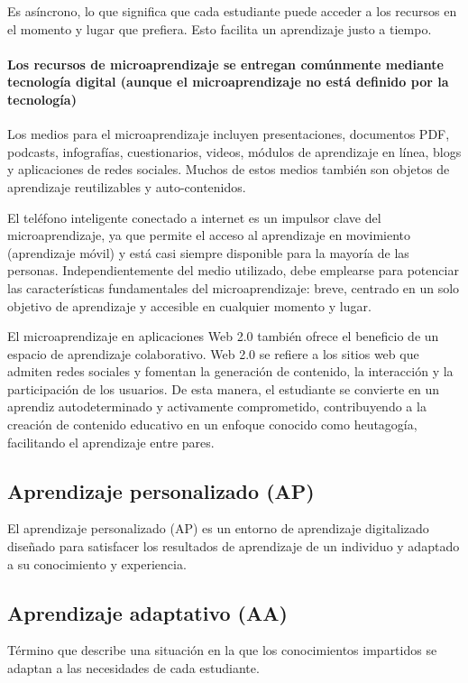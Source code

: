 Es asíncrono, lo que significa que cada estudiante puede acceder a los recursos
en el momento y lugar que prefiera. Esto facilita un aprendizaje justo a tiempo.
\cite{article:when_i_say_microlearning}

\paragraph{\textbf{Los recursos de microaprendizaje se entregan comúnmente
mediante tecnología digital (aunque el microaprendizaje no está definido por la
tecnología)}}

Los medios para el microaprendizaje incluyen presentaciones, documentos PDF,
podcasts, infografías, cuestionarios, videos, módulos de aprendizaje en línea,
blogs y aplicaciones de redes sociales. Muchos de estos medios también son
objetos de aprendizaje reutilizables y auto-contenidos. 

El teléfono inteligente conectado a internet es un impulsor clave del
microaprendizaje, ya que permite el acceso al aprendizaje en movimiento
(aprendizaje móvil) y está casi siempre disponible para la mayoría de las
personas. Independientemente del medio utilizado, debe emplearse para potenciar
las características fundamentales del microaprendizaje: breve, centrado en un
solo objetivo de aprendizaje y accesible en cualquier momento y lugar.

El microaprendizaje en aplicaciones Web 2.0 también ofrece el beneficio de un
espacio de aprendizaje colaborativo. Web 2.0 se refiere a los sitios web que
admiten redes sociales y fomentan la generación de contenido, la interacción y
la participación de los usuarios. De esta manera, el estudiante se convierte en
un aprendiz autodeterminado y activamente comprometido, contribuyendo a la
creación de contenido educativo en un enfoque conocido como heutagogía,
facilitando el aprendizaje entre pares.
\cite{article:when_i_say_microlearning}

\subsection{Aprendizaje personalizado (AP)}
El aprendizaje personalizado (AP) es un entorno de aprendizaje digitalizado
diseñado para satisfacer los resultados de aprendizaje de un individuo y
adaptado a su conocimiento y experiencia.
\cite{article:elearning_future_trends_shahid}

\subsection{Aprendizaje adaptativo (AA)}
Término que describe una situación en la que los conocimientos impartidos se
adaptan a las necesidades de cada estudiante.
\cite{article:elearning_future_trends_shahid}

